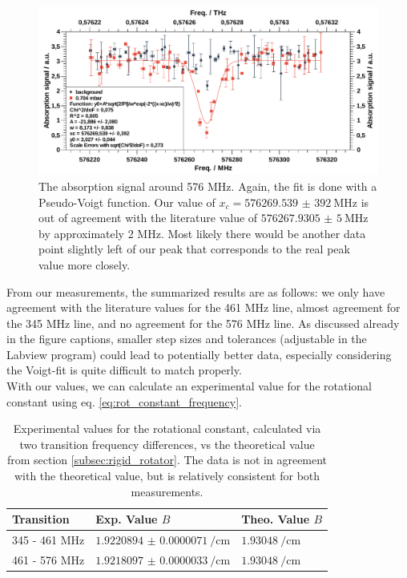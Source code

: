 \documentclass[a4paper,10pt]{scrartcl}
\begin{document}
\begin{figure}[H]
\centering
\includegraphics[width=\textwidth]{img/co_576}
\caption{The absorption signal around 576 MHz. Again, the fit is done with a Pseudo-Voigt function. Our value of $x_c=\SI{576269,539(392)}{\mega\hertz}$ is out of agreement with the literature value of $\SI{576267,9305(5)}{\mega\hertz}$ by approximately 2 MHz. Most likely there would be another data point slightly left of our peak that corresponds to the real peak value more closely.}
\label{fig:co_576}
\end{figure}
From our measurements, the summarized results are as follows: we only have agreement with the literature values for the 461 MHz line, almost agreement for the 345 MHz line, and no agreement for the 576 MHz line. As discussed already in the figure captions, smaller step sizes and tolerances (adjustable in the Labview program) could lead to potentially better data, especially considering the Voigt-fit is quite difficult to match properly.\\
With our values, we can calculate an experimental value for the rotational constant using eq. \eqref{eq:rot_constant_frequency}. 
\begin{table}[H]
\centering
    \begin{tabular}{l|ll}
    Transition    & Exp. Value $B$                         & Theo. Value $B$                 \\ \hline
    345 - 461 MHz & $\SI{1.9220894(71)
}{\per\centi\meter}$ & $\SI{1.93048}{\per\centi\meter}$ \\
    461 - 576 MHz & $\SI{1.9218097(33)}{\per\centi\meter}$  & $\SI{1.93048}{\per\centi\meter}$ \\
    \end{tabular}\caption{Experimental values for the rotational constant, calculated via two transition frequency differences, vs the theoretical value from section \ref{subsec:rigid_rotator}. The data is not in agreement with the theoretical value, but is relatively consistent for both measurements.}
\end{table}
\end{document}
